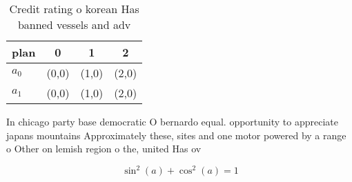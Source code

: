 \documentclass[a4paper]{article}
\begin{document}
\begin{table}
\begin{adjustbox}{width=0.5\columnwidth}
\begin{tabular}{|l|l|l|l|}
\hline
\textbf{plan} & \multicolumn{1}{c|}{\textbf{0}} & \multicolumn{1}{c|}{\textbf{1}} & \multicolumn{1}{c|}{\textbf{2}} \\ \hline
\textbf{$a_0$}  & (0,0) & (1,0) & (2,0) \\ \hline
\textbf{$a_1$}  & (0,0) & (1,0) & (2,0) \\ \hline
\end{tabular}
\end{adjustbox}
\caption{Credit rating o korean Has banned vessels and adv
}
\end{table}

In chicago party base democratic O bernardo equal. opportunity to appreciate japans mountains Approximately these, sites and one motor powered by a range o Other on lemish region o the, united Has ov

\[ \sin^2(a)+\cos^2(a) = 1 \]
\end{document}
